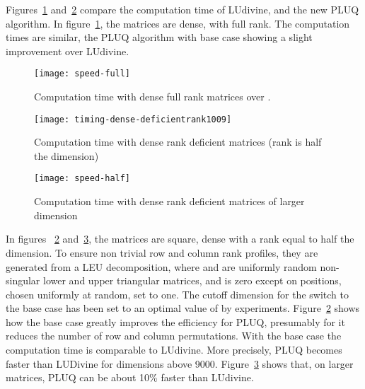 \documentclass{article}
\begin{document}
Figures~\ref{fig:densefull} and~\ref{fig:densedeficient}  compare the computation time of
LUdivine, and the new PLUQ algorithm. In figure~\ref{fig:densefull}, the matrices are dense, with full rank. The
computation times are similar, the PLUQ algorithm with base case showing a
slight improvement over LUdivine. 
\begin{figure}[htb]
   \texttt{[image: speed-full]}
   \caption{Computation time with dense full rank matrices over .}
   \label{fig:densefull}
\end{figure}
\begin{figure}[thb]
   \texttt{[image: timing-dense-deficientrank1009]}
   \caption{Computation time with dense rank deficient matrices (rank is half
     the dimension)}
   \label{fig:densedeficient}
\end{figure}
\begin{figure}[htb]
   \texttt{[image: speed-half]}
   \caption{Computation time with dense rank deficient matrices of larger dimension}
   \label{fig:densedeficientlarge}
\end{figure}
In figures ~\ref{fig:densedeficient} and~\ref{fig:densedeficientlarge}, the
matrices are square, dense with a rank equal to half the dimension. To ensure
non trivial row and column rank profiles, they are generated from a LEU
decomposition, where  and  are uniformly random non-singular lower and
upper triangular matrices, and  is zero except on  positions, chosen
uniformly at random, set to one.
The cutoff dimension for the switch to the base case has been set to an optimal
value of  by experiments. Figure~\ref{fig:densedeficient}
shows how the base case greatly improves the efficiency for PLUQ, presumably for
it reduces the number of row and column permutations. With the base case the computation
time is comparable to LUdivine. More precisely, PLUQ becomes faster than
LUDivine for dimensions above 9000. Figure~\ref{fig:densedeficientlarge} shows
that, on larger matrices, PLUQ can be about 10\% faster than LUdivine.
\end{document}
